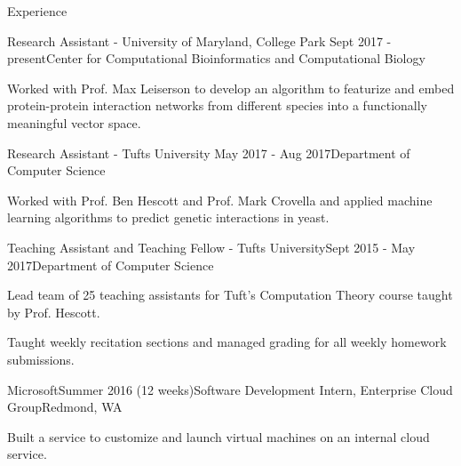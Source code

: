\documentclass{resume}
\begin{document}
  \begin{rSection}{Experience}
    \begin{rSubsection}{Research Assistant - University of Maryland, College Park} {Sept 2017 - present}{Center for Computational Bioinformatics and Computational Biology}{}
    \item Worked with Prof. Max Leiserson to develop an algorithm to featurize and embed protein-protein interaction networks from different species into a functionally meaningful vector space.
    \end{rSubsection}
    \begin{rSubsection}{Research Assistant - Tufts University} {May 2017 - Aug 2017}{Department of Computer Science}{}
    \item Worked with Prof. Ben Hescott and Prof. Mark Crovella and applied machine learning algorithms to predict genetic interactions in yeast.
    \end{rSubsection}

    \begin{rSubsection}{Teaching Assistant and Teaching Fellow - Tufts University}{Sept 2015 - May 2017}{Department of Computer Science}{}
    \item Lead team of 25 teaching assistants for Tuft's Computation Theory course taught by Prof. Hescott.
    \item Taught weekly recitation sections and managed grading for all weekly homework submissions.
    \end{rSubsection}
  
    \begin{rSubsection}{Microsoft}{Summer 2016 (12 weeks)}{Software Development Intern, Enterprise Cloud Group}{Redmond, WA}
    \item Built a service to customize and launch virtual machines on an internal cloud service.
    \end{rSubsection}

  

\end{rSection}
\end{document}
